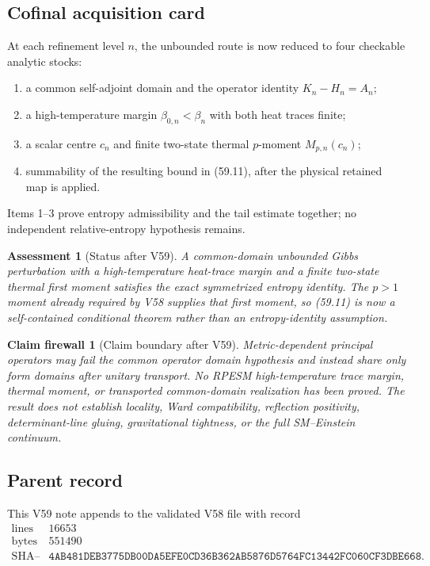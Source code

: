 \documentclass[11pt]{article}
\newtheorem{firewall}[theorem]{Claim firewall}
\newtheorem{assessment}[theorem]{Assessment}
\theoremstyle{remark}
\begin{document}
\subsection{Cofinal acquisition card}

At each refinement level \(n\), the unbounded route is now reduced
to four checkable analytic stocks:
\begin{enumerate}
\item a common self-adjoint domain and the operator identity
\(K_n-H_n=A_n\);
\item a high-temperature margin
\(\beta_{0,n}<\beta_n\) with both heat traces finite;
\item a scalar centre \(c_n\) and finite two-state thermal
\(p\)-moment \(M_{p,n}(c_n)\);
\item summability of the resulting bound in (59.11), after the
physical retained map is applied.
\end{enumerate}
Items 1--3 prove entropy admissibility and the tail estimate
together; no independent relative-entropy hypothesis remains.

\begin{assessment}[Status after V59]
\label{ass:v12v59-status}
A common-domain unbounded Gibbs perturbation with a
high-temperature heat-trace margin and a finite two-state thermal
first moment satisfies the exact symmetrized entropy identity.
The \(p>1\) moment already required by V58 supplies that first
moment, so (59.11) is now a self-contained conditional theorem rather
than an entropy-identity assumption.
\end{assessment}

\begin{firewall}[Claim boundary after V59]
\label{fire:v12v59-claim}
Metric-dependent principal operators may fail the common operator
domain hypothesis and instead share only form domains after unitary
transport.  No RPESM high-temperature trace margin, thermal moment,
or transported common-domain realization has been proved.  The
result does not establish locality, Ward compatibility, reflection
positivity, determinant-line gluing, gravitational tightness, or
the full SM--Einstein continuum.
\end{firewall}

\subsection{Parent record}

This V59 note appends to the validated V58 file with record
\[
\begin{array}{c|c}
\text{lines}&16653\\
\text{bytes}&551490\\
\text{SHA--256}&
\texttt{4AB481DEB3775DB00DA5EFE0CD36B362AB5876D5764FC13442FC060CF3DBE668}.
\end{array}
\]
\end{document}
